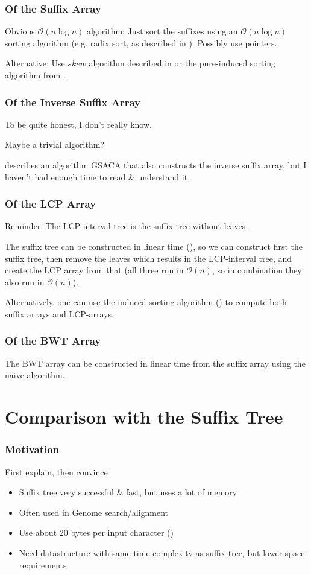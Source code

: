 \documentclass[compress,handout]{beamer} %
\renewcommand{\O}{\mathcal{O}}
\begin{document}
\begin{frame}
	\frametitle{Of the Suffix Array} Obvious $\O(n \log n)$
	algorithm: Just sort the suffixes using an $\O(n \log
	n)$ sorting algorithm (e.g. radix sort, as described in
	\cite{manber1994suffix}). Possibly use pointers.

	Alternative: Use $skew$ algorithm described in
	\cite{karkkainen2003simple} or the pure-induced sorting
	algorithm from \cite{nong2009linear}.
\end{frame}

\begin{frame}
	\frametitle{Of the Inverse Suffix Array}
	To be quite honest, I don't really know.

	Maybe a trivial algorithm?

	\cite{baier2015linear} describes an algorithm GSACA that also
	constructs the inverse suffix array, but I haven't had enough
	time to read \& understand it.
\end{frame}

\begin{frame}
	\frametitle{Of the LCP Array}
	Reminder: The LCP-interval tree is the suffix tree without leaves.

	The suffix tree can be constructed in linear time
	(\cite{giegerich1997ukkonen}), so we can construct first
	the suffix tree, then remove the leaves which results in the
	LCP-interval tree, and create the LCP array from that (all three
	run in $\O(n)$, so in combination they also run in $\O(n)$).

	Alternatively, one can use the induced sorting algorithm
	(\cite{fischer2011inducing}) to compute both suffix arrays
	and LCP-arrays.
\end{frame}

\begin{frame}
	\frametitle{Of the BWT Array}
	The BWT array can be constructed in linear time from the suffix
	array using the naive algorithm.
\end{frame}

\section{Comparison with the Suffix Tree}

\begin{frame}
	\frametitle{Motivation}
	First explain, then convince

	\begin{itemize}
		\item Suffix tree very successful \& fast, but uses a lot of memory
		\item Often used in Genome search/alignment
		\item Use about 20 bytes per input character (\cite{kurtz1999reducing})
		\item Need datastructure with same time complexity as suffix tree, but lower space requirements
	\end{itemize}
\end{frame}
\end{document}
